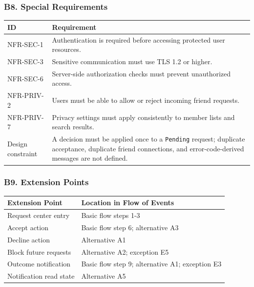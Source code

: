 \documentclass[12pt]{article}
\renewcommand{\baselinestretch}{1.5}
\begin{document}
\hypertarget{sec:b8-special-requirements}{}
\subsubsection*{B8. Special Requirements}
\par\medskip

\begingroup
\small
\renewcommand{\baselinestretch}{1.0}\selectfont
\renewcommand{\arraystretch}{1.15}
\setlength{\tabcolsep}{6pt}
\begin{longtable}{|>{\raggedright\arraybackslash}p{}|>{\raggedright\arraybackslash}p{}|}
\hline
\textbf{ID} & \textbf{Requirement} \\ \hline
\endhead
NFR-SEC-1 & Authentication is required before accessing protected user resources. \\ \hline
NFR-SEC-3 & Sensitive communication must use TLS 1.2 or higher. \\ \hline
NFR-SEC-6 & Server-side authorization checks must prevent unauthorized access. \\ \hline
NFR-PRIV-2 & Users must be able to allow or reject incoming friend requests. \\ \hline
NFR-PRIV-7 & Privacy settings must apply consistently to member lists and search results. \\ \hline
Design constraint & A decision must be applied once to a \texttt{Pending} request; duplicate acceptance, duplicate friend connections, and error-code-derived messages are not defined. \\ \hline
\end{longtable}
\endgroup
\par\medskip

\hypertarget{sec:b9-extension-points}{}
\subsubsection*{B9. Extension Points}
\par\medskip

\begingroup
\small
\renewcommand{\baselinestretch}{1.0}\selectfont
\renewcommand{\arraystretch}{1.15}
\setlength{\tabcolsep}{6pt}
\begin{longtable}{|>{\raggedright\arraybackslash}p{}|>{\raggedright\arraybackslash}p{}|}
\hline
\textbf{Extension Point} & \textbf{Location in Flow of Events} \\ \hline
\endhead
Request center entry & Basic flow steps 1-3 \\ \hline
Accept action & Basic flow step 6; alternative A3 \\ \hline
Decline action & Alternative A1 \\ \hline
Block future requests & Alternative A2; exception E5 \\ \hline
Outcome notification & Basic flow step 9; alternative A1; exception E3 \\ \hline
Notification read state & Alternative A5 \\ \hline
\end{longtable}
\endgroup
\par\medskip
\end{document}

